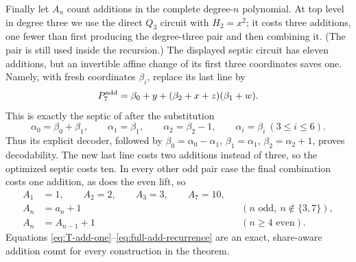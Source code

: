 Finally let $A_n$ count additions in the complete degree-$n$ polynomial.
At top level in degree three we use the direct $Q_3$ circuit with
$H_2=x^2$; it costs three additions, one fewer than first producing the
degree-three pair and then combining it.  (The pair is still used inside
the recursion.)  The displayed septic circuit has eleven additions, but an
invertible affine change of its first three coordinates saves one.  Namely,
with fresh coordinates $\beta_i$, replace its last line by
\[
 P^{\rm add}_7=\beta_0+y+
   (\beta_2+x+z)(\beta_1+w).
\]
This is exactly the septic of  after the substitution
\[
 \alpha_0=\beta_0+\beta_1,\qquad
 \alpha_1=\beta_1,\qquad
 \alpha_2=\beta_2-1,
 \qquad \alpha_i=\beta_i\ (3\le i\le6).
\]
Thus its explicit decoder, followed by
$\beta_0=\alpha_0-\alpha_1$, $\beta_1=\alpha_1$,
$\beta_2=\alpha_2+1$, proves decodability.  The new last line costs two
additions instead of three, so the optimized septic costs ten.  In every
other odd pair case the final combination costs one addition, as does the
even lift, so
\begin{equation}
 \begin{aligned}
 A_1&=1,\qquad A_2=2,\qquad A_3=3,\qquad A_7=10,\\
 A_n&=a_n+1 &&(n\text{ odd},\ n\notin\{3,7\}),\\
 A_n&=A_{n-1}+1 &&(n\ge4\text{ even}).
 \end{aligned}
 \label{eq:full-add-recurrence}
\end{equation}
Equations
\eqref{eq:T-add-one}--\eqref{eq:full-add-recurrence} are an exact,
share-aware addition count for every construction in the theorem.

